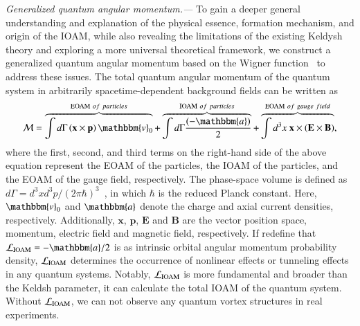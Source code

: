 \documentclass[prl,twocolumn,floatfix,amsmath,nofootinbib,superscriptaddress,amssymb,preprintnumbers,floatfix]{revtex4-1}
\begin{document}
\emph{Generalized quantum angular momentum.---}
To gain a deeper general understanding and explanation of the physical essence, formation mechanism, and origin of the IOAM, while also revealing the limitations of the existing Keldysh theory and exploring a more universal theoretical framework, we construct a generalized quantum angular momentum based on the Wigner function~\cite{Peskin:2018} to address these issues. The total quantum angular momentum of the quantum system in arbitrarily spacetime-dependent background fields can be written as
\begin{equation}\label{eq:1}
\mathcal{M} = \overbrace{\int d\Gamma \left(\mathbf{x} \times \mathbf{p}\right) \mathbbm{v}_0}^{{\rm EOAM}~of~particles}  + \overbrace{\int d\Gamma \frac{(-\mathbbm{a})}{2}}^{{\rm IOAM}~of~particles} + \overbrace{\int d^3x~ \mathbf{x} \times \left( \mathbf{E} \times \mathbf{B}\right)}^{{\rm EOAM} ~of~gauge~field},
\end{equation}
where the first, second, and third terms on the right-hand side of the above equation represent the EOAM of the particles, the IOAM of the particles, and the EOAM of the gauge field, respectively. The phase-space volume is defined as $d\Gamma=d^3xd^3p/(2\pi\hbar)^{3}$~\cite{Bialynicki-Birula:1991jwl,Hebenstreit:2011}, in which $\hbar$ is the reduced Planck constant. Here, $\mathbbm{v}_0$ and $\mathbbm{a}$ denote the charge and axial current densities, respectively\cite{Bialynicki-Birula:1991jwl,Sheng:2019ujr}. Additionally, $\mathbf{x}$, $\mathbf{p}$, $\mathbf{E}$ and $\mathbf{B}$ are the vector position space, momentum, electric field and magnetic field, respectively.
If redefine that $\mathcal{L}_{\rm IOAM}=-\mathbbm{a}/2$ is as intrinsic orbital angular momentum probability density, $\mathcal{L}_{\rm IOAM}$ determines the occurrence of nonlinear effects or tunneling effects in any quantum systems. Notably, $\mathcal{L}_{\rm IOAM}$ is more fundamental and broader than the Keldsh parameter, it can calculate the total IOAM of the quantum system. Without $\mathcal{L}_{\rm IOAM}$, we can not observe any quantum vortex structures in real experiments.
\end{document}

